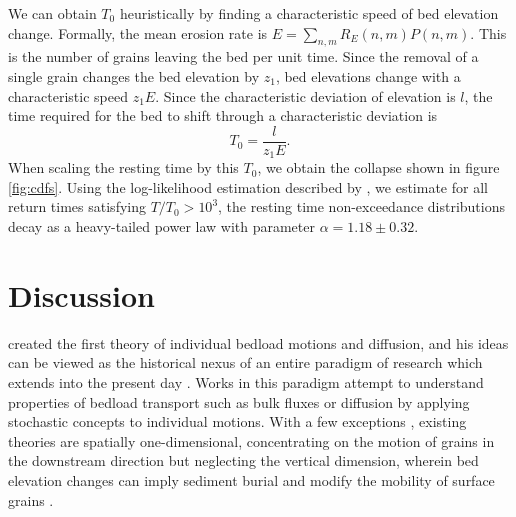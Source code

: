 \documentclass[draft]{agujournal2018}
\newcommand\be{\begin{equation}} %
\newcommand\ee{\end{equation}}   %
\begin{document}
We can obtain $T_0$ heuristically by finding a characteristic speed of bed elevation change.
Formally, the mean erosion rate is $E = \sum_{n,m}R_E(n,m)P(n,m)$.
This is the number of grains leaving the bed per unit time.
Since the removal of a single grain changes the bed elevation by $z_1$, bed elevations change with a characteristic speed $z_1 E$.
Since the characteristic deviation of elevation is $l$, the time required for the bed to shift through a characteristic deviation is
\be T_0 = \frac{l}{z_1 E}.\label{eq:time}\ee
When scaling the resting time by this $T_0$, we obtain the collapse shown in figure \ref{fig:cdfs}.
Using the log-likelihood estimation described by \citet{Newman2005}, we estimate for all return times satisfying $T/T_0 > 10^3$, the resting time non-exceedance distributions decay as a heavy-tailed power law with parameter $\alpha = 1.18 \pm 0.32$.

\section{Discussion}


\citet{Einstein1937} created the first theory of individual bedload motions and diffusion, and his ideas can be viewed as the historical nexus of an entire paradigm of research which extends into the present day \citep[e.g.][]{Hubbell1964,Yano1969, Nakagawa1976,Hassan1991,Ancey2008,Phillips2013,Martin2014, Furbish2012, Heyman2016, Bradley2017}.
Works in this paradigm attempt to understand properties of bedload transport such as bulk fluxes or diffusion by applying stochastic concepts to individual motions.
With a few exceptions \citep[e.g.][]{Yang1971,Nakagawa1980,Wu2019}, existing theories are spatially one-dimensional, concentrating on the motion of grains in the downstream direction but neglecting the vertical dimension, wherein bed elevation changes can imply sediment burial \citep[e.g.][]{Voepel2013,Martin2014} and modify the mobility of surface grains \citep[e.g.][]{Yang1971,Nakagawa1980,Sawai1987,Wong2007}.
\end{document}
